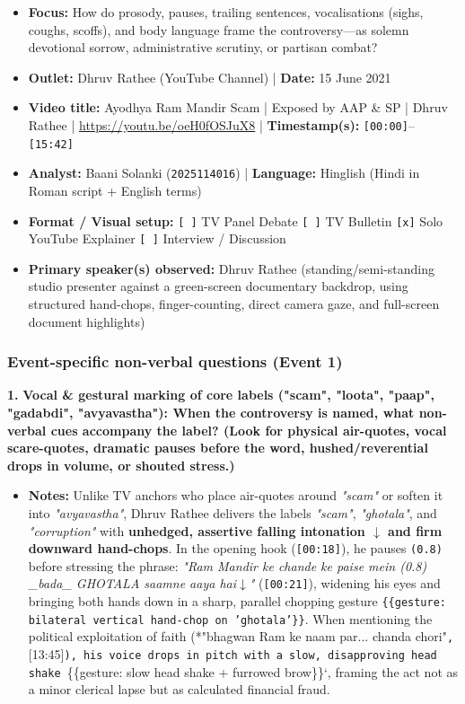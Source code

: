 \documentclass[10pt,a4paper]{article}
\begin{document}
\begin{itemize}
  \item \textbf{Focus:} How do prosody, pauses, trailing sentences, vocalisations (sighs, coughs, scoffs), and body language frame the controversy---as solemn devotional sorrow, administrative scrutiny, or partisan combat?
  \item \textbf{Outlet:} Dhruv Rathee (YouTube Channel) | \textbf{Date:} 15 June 2021
  \item \textbf{Video title:} Ayodhya Ram Mandir Scam | Exposed by AAP \& SP | Dhruv Rathee | \href{https://youtu.be/oeH0fOSJuX8}{https://youtu.be/oeH0fOSJuX8} | \textbf{Timestamp(s):} \texttt{[00:00]}--\texttt{[15:42]}
  \item \textbf{Analyst:} Baani Solanki (\texttt{2025114016}) | \textbf{Language:} Hinglish (Hindi in Roman script + English terms)
  \item \textbf{Format / Visual setup:} \texttt{[ ]} TV Panel Debate \texttt{[ ]} TV Bulletin \texttt{[x]} Solo YouTube Explainer \texttt{[ ]} Interview / Discussion
  \item \textbf{Primary speaker(s) observed:} Dhruv Rathee (standing/semi-standing studio presenter against a green-screen documentary backdrop, using structured hand-chops, finger-counting, direct camera gaze, and full-screen document highlights)
\end{itemize}

\subsubsection*{Event-specific non-verbal questions (Event 1)}

\noindent\textbf{1.} \textbf{Vocal \& gestural marking of core labels ("scam", "loota", "paap", "gadabdi", "avyavastha"): When the controversy is named, what non-verbal cues accompany the label? (Look for physical air-quotes, vocal scare-quotes, dramatic pauses before the word, hushed/reverential drops in volume, or shouted stress.)}\par\smallskip
\begin{itemize}
  \item \textbf{Notes:}
Unlike TV anchors who place air-quotes around \textit{"scam"} or soften it into \textit{"avyavastha"}, Dhruv Rathee delivers the labels \textit{"scam"}, \textit{"ghotala"}, and \textit{"corruption"} with \textbf{unhedged, assertive falling intonation \texttt{$\downarrow$} and firm downward hand-chops}. In the opening hook (\texttt{[00:18]}), he pauses \texttt{(0.8)} before stressing the phrase: \textit{"Ram Mandir ke chande ke paise mein (0.8) \_bada\_ GHOTALA saamne aaya hai$\downarrow$"} (\texttt{[00:21]}), widening his eyes and bringing both hands down in a sharp, parallel chopping gesture \texttt{\{\{gesture: bilateral vertical hand-chop on 'ghotala'\}\}}. When mentioning the political exploitation of faith (*"bhagwan Ram ke naam par... chanda chori"\texttt{, }[13:45]\texttt{), his voice drops in pitch with a slow, disapproving head shake }\{\{gesture: slow head shake + furrowed brow\}\}`, framing the act not as a minor clerical lapse but as calculated financial fraud.\par\smallskip
\end{itemize}
\end{document}
